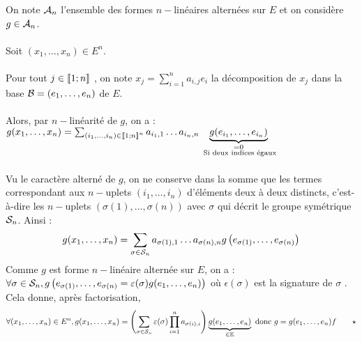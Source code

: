 \begin{dem}
    On note \(\cal{A}_n\) l’ensemble des formes \(n-\)linéaires alternées sur \(E\) et on considère \(g \in \cal{A}_n\).\\~\\
    Soit \((x_1, \dots , x_n) \in E^n\).\\~\\
    Pour tout \(j \in \interventierii{1}{n}\) , on note \(x_j = \sum^n_{i=1} a_{i,j} e_i\) la décomposition de \(x_j\) dans la base \(\cal{B} = \paren{e_1, \dots , e_n}\) de \(E\).\\~\\
    Alors, par \(n-\)linéarité de \(g\), on a : \(g (x_1, \dots , x_n) = \sum_{(i_1,\dots,i_n)\in \interventierii{1}{n}^n} a_{i_1,1} \dots a_{i_n,n} \underbrace{g (e_{i_1} , \dots , e_{i_{n}} )}_{\substack{= 0\\ \text{ Si deux indices égaux}}}\)\\~\\
    Vu le caractère alterné de \(g\), on ne conserve dans la somme que les termes correspondant aux \(n-\)uplets \((i_1, \dots , i_n)\) d’éléments deux à deux distincts, c’est-à-dire les \(n-\)uplets \((\sigma (1), \dots , \sigma (n))\) avec \(\sigma\)  qui décrit le groupe symétrique \(\cal{S}_n\). Ainsi :
    \[g (x_1, \dots , x_n) = \sum_{\sigma \in\cal{S}_n} a_{\sigma (1),1} \dots a_{\sigma (n),n} g \paren{e_{\sigma (1)}, \dots , e_{\sigma (n)}}\]
    Comme \(g\) est forme \(n-\)linéaire alternée sur \(E\), on a : \(\forall \sigma  \in \cal{S}_n, g \paren{e_{\sigma (1)}, \dots , e_{\sigma (n)}  = \epsilon(\sigma )g(e_1, \dots , e_n)}\) où \(\epsilon(\sigma )\) est la signature de \(\sigma\) . Cela donne, après factorisation,
    \[\forall  (x_1, \dots , x_n) \in E^n, g (x_1, \dots , x_n) = \paren{\sum_{\sigma \in\cal{S}_n} \epsilon(\sigma ) \prod^n_{i=1} a_{\sigma (i),i}} \underbrace{g (e_1, \dots , e_n)}_{\in \K} \text{ donc } g = g (e_1, \dots , e_n)f \qquad \star\]


\end{dem}
